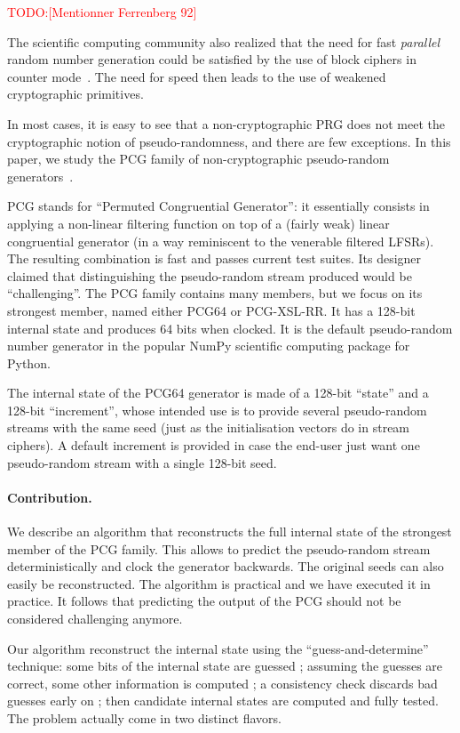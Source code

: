 \documentclass[preprint,svgnames]{iacrtrans}
\newcommand{\todo}[1]{\textcolor{red}{TODO:[#1]}}
\begin{document}
\todo{Mentionner Ferrenberg 92}

The scientific computing community also realized that the need for fast
\emph{parallel} random number generation could be satisfied by the use of block
ciphers in counter mode~\cite{Salmon11}. The need for speed then leads to the
use of weakened cryptographic primitives.

In most cases, it is easy to see that a non-cryptographic PRG does not meet the
cryptographic notion of pseudo-randomness, and there are few exceptions. In this
paper, we study the \textsf{PCG} family of non-cryptographic pseudo-random
generators~\cite{melissapaper,melissaweb}.

\textsf{PCG} stands for ``Permuted Congruential Generator'': it essentially
consists in applying a non-linear filtering function on top of a (fairly weak)
linear congruential generator (in a way reminiscent to the venerable filtered
LFSRs). The resulting combination is fast and passes current test suites. Its
designer claimed that distinguishing the pseudo-random stream produced would be
``challenging''. The \textsf{PCG} family contains many members, but we focus on
its strongest member, named either \textsf{PCG64} or \textsf{PCG-XSL-RR}. It has
a 128-bit internal state and produces 64 bits when clocked. It is the default
pseudo-random number generator in the popular \textsf{NumPy} scientific
computing package for \textsf{Python}.

The internal state of the \textsf{PCG64} generator is made of a 128-bit
``state'' and a 128-bit ``increment'', whose intended use is to provide several
pseudo-random streams with the same seed (just as the initialisation vectors do
in stream ciphers). A default increment is provided in case the end-user just
want one pseudo-random stream with a single 128-bit seed.

\paragraph{Contribution.} We describe an algorithm that reconstructs the full
internal state of the strongest member of the \textsf{PCG} family. This allows
to predict the pseudo-random stream deterministically and clock the generator
backwards. The original seeds can also easily be reconstructed. The algorithm is
practical and we have executed it in practice. It follows that predicting the
output of the \textsf{PCG} should not be considered challenging anymore.

Our algorithm reconstruct the internal state using the ``guess-and-determine''
technique: some bits of the internal state are guessed ; assuming the guesses
are correct, some other information is computed ; a consistency check discards
bad guesses early on ; then candidate internal states are computed and fully
tested. The problem actually come in two distinct flavors.
\end{document}
